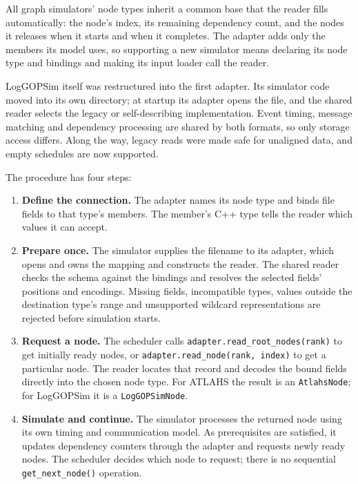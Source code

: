 \documentclass[10pt,a4paper]{article}
\begin{document}
All graph simulators' node types inherit a common base that the reader fills automatically: the node's index, its remaining dependency count, and the nodes it releases when it starts and when it completes. The adapter adds only the members its model uses, so supporting a new simulator means declaring its node type and bindings and making its input loader call the reader.

LogGOPSim itself was restructured into the first adapter. Its simulator code moved into its own directory; at startup its adapter opens the file, and the shared reader selects the legacy or self-describing implementation. Event timing, message matching and dependency processing are shared by both formats, so only storage access differs. Along the way, legacy reads were made safe for unaligned data, and empty schedules are now supported.

The procedure has four steps:

\begin{enumerate}
\item \textbf{Define the connection.} The adapter names its node type and binds file fields to that type's members. The member's C++ type tells the reader which values it can accept.
\item \textbf{Prepare once.} The simulator supplies the filename to its adapter, which opens and owns the mapping and constructs the reader. The shared reader checks the schema against the bindings and resolves the selected fields' positions and encodings. Missing fields, incompatible types, values outside the destination type's range and unsupported wildcard representations are rejected before simulation starts.
\item \textbf{Request a node.} The scheduler calls \texttt{adapter.\allowbreak{}read\_\allowbreak{}root\_\allowbreak{}nodes(rank)} to get initially ready nodes, or \texttt{adapter.\allowbreak{}read\_\allowbreak{}node(rank, i\allowbreak{}ndex)} to get a particular node. The reader locates that record and decodes the bound fields directly into the chosen node type. For ATLAHS the result is an \texttt{AtlahsNode}; for LogGOPSim it is a \texttt{LogGOPSimNod\allowbreak{}e}.
\item \textbf{Simulate and continue.} The simulator processes the returned node using its own timing and communication model. As prerequisites are satisfied, it updates dependency counters through the adapter and requests newly ready nodes. The scheduler decides which node to request; there is no sequential \texttt{get\_\allowbreak{}next\_\allowbreak{}node()} operation.
\end{enumerate}
\end{document}

